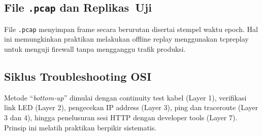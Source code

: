 \subsection{File \texttt{.pcap} dan Replikas Uji}
File \texttt{.pcap} menyimpan frame secara berurutan disertai stempel waktu epoch. Hal ini memungkinkan praktikan melakukan offline replay menggunakan tcpreplay untuk menguji firewall tanpa mengganggu trafik produksi.

\subsection{Siklus Troubleshooting OSI}
Metode “\emph{bottom‑up}” dimulai dengan continuity test kabel (Layer 1), verifikasi link LED (Layer 2), pengecekan IP address (Layer 3), ping dan traceroute (Layer 3 dan 4), hingga penelusuran sesi HTTP dengan developer tools (Layer 7). Prinsip ini melatih praktikan berpikir sistematis.

